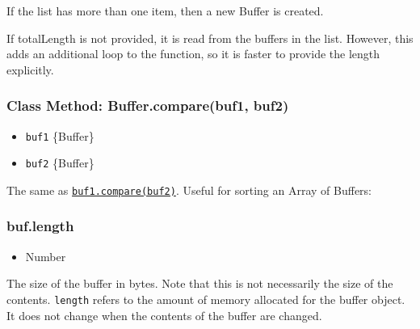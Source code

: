 If the list has more than one item, then a new Buffer is created.

If totalLength is not provided, it is read from the buffers in the list.
However, this adds an additional loop to the function, so it is faster
to provide the length explicitly.

\subsubsection{Class Method: Buffer.compare(buf1,
buf2)}\label{class-method-buffer.comparebuf1-buf2}

\begin{itemize}
\itemsep1pt\parskip0pt
\item
  \texttt{buf1} \{Buffer\}
\item
  \texttt{buf2} \{Buffer\}
\end{itemize}

The same as
\hyperref[bufferux5fbufux5fcompareux5fotherbuffer]{\texttt{buf1.compare(buf2)}}.
Useful for sorting an Array of Buffers:

\begin{Shaded}
\begin{Highlighting}[]
 \NormalTok{arr = [}\NormalTok{(}\NormalTok{), }\NormalTok{(}\NormalTok{)];}
\NormalTok{(}\NormalTok{);}
\end{Highlighting}
\end{Shaded}

\subsubsection{buf.length}\label{buf.length}

\begin{itemize}
\itemsep1pt\parskip0pt
\item
  Number
\end{itemize}

The size of the buffer in bytes. Note that this is not necessarily the
size of the contents. \texttt{length} refers to the amount of memory
allocated for the buffer object. It does not change when the contents of
the buffer are changed.

\begin{Shaded}
\begin{Highlighting}[]
 \NormalTok{(}\NormalTok{);}

\NormalTok{(}\NormalTok{);}
\NormalTok{(}\NormalTok{, }\NormalTok{, }\NormalTok{);}
\NormalTok{(}\NormalTok{);}

\end{Highlighting}
\end{Shaded}

